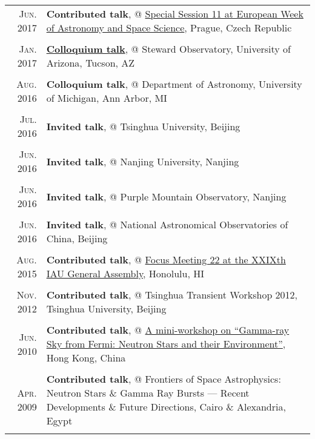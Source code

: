 \documentclass[letterpaper,10pt]{article}
\newcommand{\textwrap}{5.8in}       %
\begin{document}
\begin{longtable}{r|p{\textwrap}}
    \textsc{Jun. 2017}   &   \textbf{Contributed talk}, @
    \href{http://eas.unige.ch/EWASS2017/session.jsp?id=SS11}{Special Session 11 at
    European Week of Astronomy and Space Science}, Prague, Czech Republic   \\
    \multicolumn{2}{c}{} \\

    \textsc{Jan. 2017}   &   \href{http://mingus.as.arizona.edu/~bjw/galaxy_group/2017spring.html}{\textbf{Colloquium talk}}, @ Steward Observatory, University of Arizona, Tucson, AZ \\
    \multicolumn{2}{c}{} \\

    \textsc{Aug. 2016}   &   \textbf{Colloquium talk}, @ Department of Astronomy, University of Michigan, Ann Arbor, MI \\
    \multicolumn{2}{c}{} \\

    \textsc{Jul. 2016}   &   \textbf{Invited talk}, @ Tsinghua University, Beijing \\
    \multicolumn{2}{c}{} \\

    \textsc{Jun. 2016}   &   \textbf{Invited talk}, @ Nanjing University, Nanjing \\
    \multicolumn{2}{c}{} \\

    \textsc{Jun. 2016}   &   \textbf{Invited talk}, @ Purple Mountain Observatory, Nanjing \\
    \multicolumn{2}{c}{} \\

    \textsc{Jun. 2016}   &   \textbf{Invited talk}, @ National Astronomical Observatories of China, Beijing   \\
    \multicolumn{2}{c}{} \\

    \textsc{Aug. 2015}   &   \textbf{Contributed talk}, @ \href{http://hffiau.epfl.ch/page-116896.html}{Focus Meeting 22 at the XXIXth IAU General Assembly}, Honolulu, HI     \\
    \multicolumn{2}{c}{} \\

    \textsc{Nov. 2012}   &   \textbf{Contributed talk}, @ Tsinghua Transient Workshop 2012, Tsinghua University, Beijing   \\
    \multicolumn{2}{c}{} \\

    \textsc{Jun. 2010}   &   \textbf{Contributed talk}, @ \href{http://www.physics.hku.hk/~astro/2010Astro/Index.htm}{A mini-workshop on ``Gamma-ray Sky from Fermi: Neutron Stars and their Environment''}, Hong Kong, China  \\
    \multicolumn{2}{c}{} \\

    \textsc{Apr. 2009}   &   \textbf{Contributed talk}, @ Frontiers of Space Astrophysics: Neutron Stars \& Gamma Ray Bursts --- Recent Developments \& Future Directions, Cairo \& Alexandria, Egypt     \\
    \multicolumn{2}{c}{}

\end{longtable}
\endgroup
\end{document}
